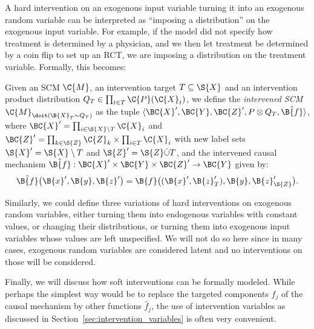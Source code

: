 A hard intervention on an exogenous input variable turning it into an exogenous random variable
can be interpreted as ``imposing a distribution'' on the exogenous input variable.
For example, if the model did not specify how treatment is determined by a physician,
and we then let treatment be determined by a coin flip to set up an RCT,
we are imposing a distribution on the treatment variable. Formally, this becomes:
\begin{Def}
  Given an SCM $\C{M}$, an intervention target $T \subseteq \S{X}$ 
  and an intervention product distribution $Q_T \in \prod_{t\in T} \C{P}(\C{X}_t)$, we define the \emph{intervened SCM
  $\C{M}_{\doit(\B{X}_T\sim Q_T)}$} as the tuple 
  $\langle \BC{X}',\BC{Y},\BC{Z}',P \otimes Q_T,\hat{\B{f}} \rangle$,
  where $\BC{X}' = \prod_{i\in\S{X}\setminus T} \C{X}_i$ and
  $\BC{Z}' = \prod_{k\in\S{Z}} \C{Z}_k \times \prod_{i\in T} \C{X}_i$
  with new label sets $\S{X}' = \S{X}\setminus T$ and $\S{Z}' = \S{Z} \dot\cup T$, 
  and the intervened causal mechanism
  $\hat{\B{f}} : \BC{X}' \times \BC{Y} \times \BC{Z}' \to \BC{Y}$ given by:
  $$\hat{\B{f}}\big(\B{x}',\B{y},\B{z}'\big) = \B{f}\big((\B{x}',\B{z}'_T),\B{y},\B{z}'_{\S{Z}}\big).$$
\end{Def}

Similarly, we could define three variations of hard interventions on exogenous random variables, 
either turning them into endogenous variables with constant values, or changing their distributions,
or turning them into exogenous input variables whose values are left unspecified. We will not do so
here since in many cases, exogenous random variables are considered latent and no interventions on
those will be considered.

Finally, we will discuss how soft interventions can be formally modeled.
While perhaps the simplest way would be to replace the targeted components $f_j$ of the
causal mechanism by other functions $\hat f_j$, the use of intervention variables as
discussed in Section~\ref{sec:intervention_variables} is often very convenient.

%
